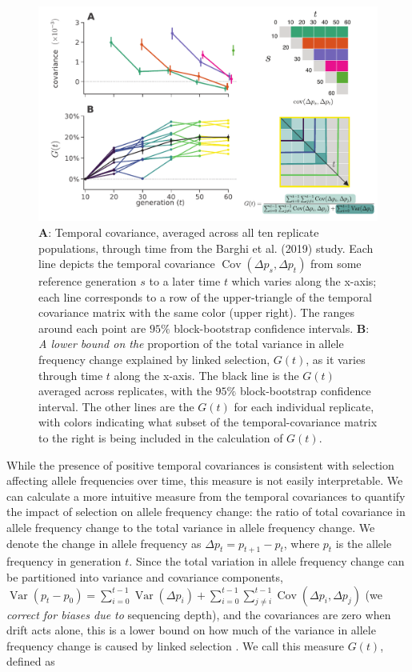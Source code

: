 \documentclass[9pt,twocolumn,twoside]{pnas-new}
\DeclareMathOperator{\var}{Var}
\DeclareMathOperator{\cov}{Cov}
\newcommand{\vb}[1]{{\it \color{red} #1}}
\begin{document}
\begin{figure}
  \centering
  \includegraphics[width=15cm]{figure-1-pnas.pdf}

  \caption{{\bf A}: Temporal covariance, averaged across all ten replicate
    populations, through time from the Barghi et al. (2019) study. Each line
    depicts the temporal covariance $\cov(\Delta p_s, \Delta p_t)$ from some
    reference generation $s$ to a later time $t$ which varies along the x-axis;
    each line corresponds to a row of the upper-triangle of the temporal
    covariance matrix with the same color (upper right). The ranges around each
    point are $95\%$ block-bootstrap confidence intervals. {\bf B}: \vb{A lower
    bound on the} proportion of the total variance in allele frequency change
    explained by linked selection, $G(t)$, as it varies through time $t$ along
    the x-axis. The black line is the $G(t)$ averaged across replicates, with
    the $95\%$ block-bootstrap confidence interval. The other lines are the
    $G(t)$ for each individual replicate, with colors indicating what subset of
    the temporal-covariance matrix to the right is being included in the
    calculation of $G(t)$.}

  \label{fig:figure-1}
\end{figure}

While the presence of positive temporal covariances is consistent with
selection affecting allele frequencies over time, this measure is not easily
interpretable. We can calculate a more intuitive measure from the temporal
covariances to quantify the impact of selection on allele frequency change: the
ratio of total covariance in allele frequency change to the total variance in
allele frequency change. We denote the change in allele frequency as $\Delta
p_t = p_{t+1}-p_t$, where $p_t$ is the allele frequency in generation $t$.
Since the total variation in allele frequency change can be partitioned into
variance and covariance components, $\var(p_t - p_0) = \sum_{i=0}^{t-1}
\var(\Delta p_i) + \sum_{i=0}^{t-1} \sum_{j \ne i}^{t-1} \cov(\Delta p_i,
\Delta p_j)$ (we \vb{correct for biases due to} sequencing depth), and the
covariances are zero when drift acts alone, this is a lower bound on how much
of the variance in allele frequency change is caused by linked selection
\cite{Buffalo2019-io}. We call this measure $G(t)$, defined as
\end{document}
